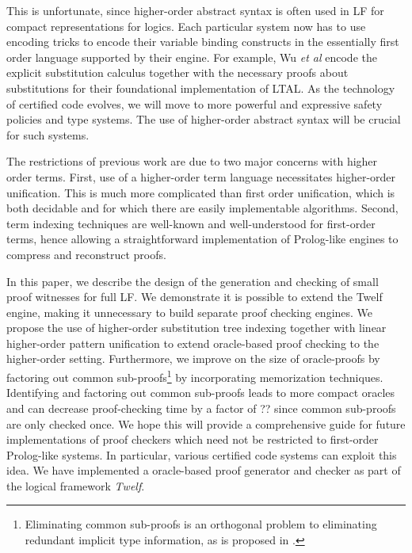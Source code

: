 \documentclass{acmconf}
\begin{document}
This is unfortunate, since higher-order abstract syntax is often used
in LF for compact representations for logics. Each particular system
now has to use encoding tricks to encode their variable binding
constructs in the essentially first order language supported by their
engine. For example, Wu {\em et al}\cite{Appel:PPDP03} encode the
explicit substitution calculus \cite{Abadi:POPL90} together with the
necessary proofs about substitutions for their foundational
implementation of LTAL. As the technology of certified code evolves,
we will move to more powerful and expressive safety policies and type
systems. The use of higher-order abstract syntax will be crucial for
such systems.

The restrictions of previous work are due to two major concerns with
higher order terms. First, use of a higher-order term language
necessitates higher-order unification. This is much more complicated
than first order unification, which is both decidable and for which
there are easily implementable algorithms. Second, term indexing
techniques are well-known and well-understood for first-order terms,
hence allowing a straightforward implementation of Prolog-like engines
to compress and reconstruct proofs.

In this paper, we describe the design of the generation and checking
of small proof witnesses for full LF. We demonstrate it is possible to
extend the Twelf engine, making it unnecessary to build separate proof
checking engines.  We propose the use of higher-order substitution
tree indexing together with linear higher-order pattern unification to
extend oracle-based proof checking to the higher-order
setting. Furthermore, we improve on the size of oracle-proofs by
factoring out common sub-proofs\footnote{Eliminating common sub-proofs
is an orthogonal problem to eliminating redundant implicit type
information, as is proposed in \cite{Necula98lics}.} by incorporating
memorization techniques. Identifying and factoring out common
sub-proofs leads to more compact oracles and can decrease
proof-checking time by a factor of ?? since common sub-proofs are only
checked once.  We hope this will provide a comprehensive guide for
future implementations of proof checkers which need not be restricted
to first-order Prolog-like systems. In particular, various certified
code systems can exploit this idea. We have implemented a oracle-based
proof generator and checker as part of the logical framework {\em
Twelf}.


\end{document}
